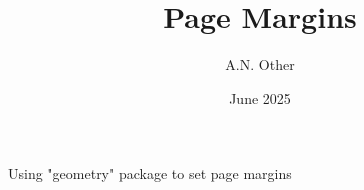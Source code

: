 \documentclass[10pt, letterpaper]{article}
\title{Page Margins}
\author{A.N. Other}
\date{June 2025}
\begin{document}
  \lipsum[1]

  Using "geometry" package to set page margins
\end{document}
